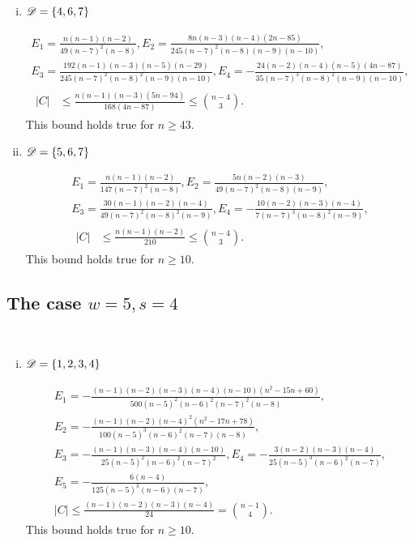 \documentclass{amsart}
\begin{document}
{\begin{enumerate}[(i)]
\item $\mathscr{D}=\{4,6,7\}$

\begin{gather*}
E_1=\frac{n(n-1)(n-2)}{49(n-7)^2(n-8)},
E_2=\frac{8n(n-3)(n-4)(2n-85)}{245(n-7)^2(n-8)(n-9)(n-10)},\\ 
E_3=\frac{192(n-1)(n-3)(n-5)(n-29)}{245(n-7)^2(n-8)^2(n-9)(n-10)},
E_4=-\frac{24(n-2)(n-4)(n-5)(4n-87)}{35(n-7)^3(n-8)^2(n-9)(n-10)},\\
\begin{aligned}
|C| &\le \frac{n(n-1)(n-3)(5n-94)}{168(4n-87)} \leq \binom{n-4}{3}.
\end{aligned}
\end{gather*}
This bound holds true for $n\ge 43.$

\item $\mathscr{D}=\{5,6,7\}$

\begin{gather*}
E_1=\frac{n(n-1)(n-2)}{147(n-7)^2(n-8)},
E_2=\frac{5n(n-2)(n-3)}{49(n-7)^2(n-8)(n-9)},\\ 
E_3=\frac{30(n-1)(n-2)(n-4)}{49(n-7)^2(n-8)^2(n-9)},
E_4=-\frac{10(n-2)(n-3)(n-4)}{7(n-7)^3(n-8)^2(n-9)},\\
\begin{aligned}
|C| &\le \frac{n(n-1)(n-2)}{210} \leq \binom{n-4}{3}.
\end{aligned}
\end{gather*}
This bound holds true for $n\ge 10.$

\end{enumerate}

\subsection{The case \texorpdfstring{$w=5,s=4$}.}  \label{App:5,4}\hfill\\
\begin{enumerate}[(i)]
\item $\mathscr{D}=\{1,2,3,4\}$

\begin{gather*}
E_1=-\frac{(n-1)(n-2)(n-3)(n-4)(n-10)\left(n^2-15n+60\right)}{500(n-5)^2(n-6)^2(n-7)^2(n-8)},\\ E_2=-\frac{(n-1)(n-2)(n-4)^2\left(n^2-17n+78\right)}{100(n-5)^3(n-6)^2(n-7)(n-8)},\\ 
E_3=-\frac{(n-1)(n-3)(n-4)(n-10)}{25(n-5)^2(n-6)^2(n-7)^2},
E_4=-\frac{3(n-2)(n-3)(n-4)}{25(n-5)^3(n-6)^2(n-7)},\\
E_5=-\frac{6(n-4)}{125(n-5)^3(n-6)(n-7)},\\
|C|\le \frac{(n-1)(n-2)(n-3)(n-4)}{24}= \binom{n-1}{4}.
\end{gather*}
This bound holds true for $n\ge 10.$


\end{enumerate}}
\end{document}
